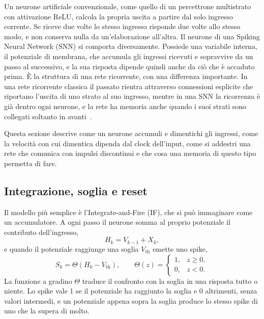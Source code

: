 Un neurone artificiale convenzionale, come quello di un percettrone multistrato con attivazione ReLU, calcola la propria uscita a partire dal solo ingresso corrente. Se riceve due volte lo stesso ingresso risponde due volte allo stesso modo, e non conserva nulla da un'elaborazione all'altra. Il neurone di una Spiking Neural Network (SNN) si comporta diversamente. Possiede una variabile interna, il potenziale di membrana, che accumula gli ingressi ricevuti e sopravvive da un passo al successivo, e la sua risposta dipende quindi anche da ciò che è accaduto prima. È la struttura di una rete ricorrente, con una differenza importante. In una rete ricorrente classica il passato rientra attraverso connessioni esplicite che riportano l'uscita di uno strato al suo ingresso, mentre in una SNN la ricorrenza è già dentro ogni neurone, e la rete ha memoria anche quando i suoi strati sono collegati soltanto in avanti~\cite{neftci2019surrogate}.

Questa sezione descrive come un neurone accumuli e dimentichi gli ingressi, come la velocità con cui dimentica dipenda dal clock dell'input, come si addestri una rete che comunica con impulsi discontinui e che cosa una memoria di questo tipo permetta di fare.

\subsection{Integrazione, soglia e reset}
\label{subsec:integrazione_soglia_reset}

Il modello più semplice è l'Integrate-and-Fire (IF), che si può immaginare come un accumulatore. A ogni passo il neurone somma al proprio potenziale il contributo dell'ingresso,
\begin{equation}
\label{eq:if_discreto}
H_k=V_{k-1}+X_k,
\end{equation}
e quando il potenziale raggiunge una soglia $V_{\mathrm{th}}$ emette uno spike,
\begin{equation}
\label{eq:if_spike}
S_k=\Theta(H_k-V_{\mathrm{th}}),
\qquad
\Theta(z)=
\begin{cases}
1,&z\geq0,\\
0,&z<0.
\end{cases}
\end{equation}
La funzione a gradino $\Theta$ traduce il confronto con la soglia in una risposta tutto o niente. Lo spike vale 1 se il potenziale ha raggiunto la soglia e 0 altrimenti, senza valori intermedi, e un potenziale appena sopra la soglia produce lo stesso spike di uno che la supera di molto.

